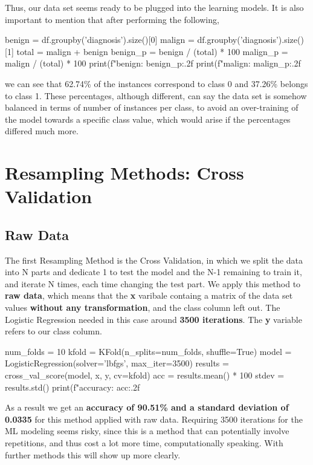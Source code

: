 \documentclass[11pt]{article}
\begin{document}
Thus, our data set seems ready to be plugged into the learning models. It is also important to mention that after performing the following,
\\

\begin{python}
benign = df.groupby('diagnosis').size()[0]
malign = df.groupby('diagnosis').size()[1]
total = malign + benign
benign_p = benign / (total) * 100
malign_p = malign / (total) * 100
print(f"benign: {benign_p:.2f}%
print(f"malign: {malign_p:.2f}%
\end{python}

we can see that 62.74\% of the instances correspond to class 0 and 37.26\% belongs to class 1. These percentages, although different, can say the data set is somehow balanced in terms of number of instances per class, to avoid an over-training of the model towards a specific class value, which would arise if the percentages differed much more.

\section{Resampling Methods: Cross Validation }

\subsection{Raw Data}

The first Resampling Method is the Cross Validation, in which we split the data into N parts and dedicate 1 to test the model and the N-1 remaining to train it, and iterate N times, each time changing the test part. We apply this method to \textbf{raw data}, which means that the \textbf{x} varibale containg a matrix of the data set values \textbf{without any transformation}, and the class column left out. The Logistic Regression needed in this case around \textbf{3500 iterations}. The \textbf{y} variable refers to our class column.
\\

\begin{python}
num_folds = 10
kfold = KFold(n_splits=num_folds, shuffle=True) 
model = LogisticRegression(solver='lbfgs', max_iter=3500)
results = cross_val_score(model, x, y, cv=kfold)
acc = results.mean() * 100 
stdev = results.std()
print(f"accuracy: {acc:.2f}%
\end{python}

As a result we get an \textbf{accuracy of 90.51\% and a standard deviation of 0.0335} for this method applied with raw data. Requiring 3500 iterations for the ML modeling seems risky, since this is a method that can potentially involve repetitions, and thus cost a lot more time, computationally speaking. With further methods this will show up more clearly.
\end{document}
